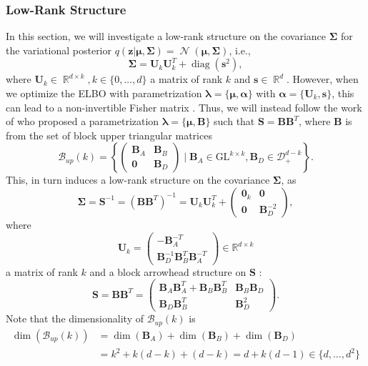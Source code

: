 \documentclass[a4paper, 11pt, oneside]{scrartcl}
\theoremstyle{break}
\DeclareMathOperator{\Normal}{\mathcal{N}}
\DeclareMathOperator{\Real}{\mathbb{R}}
\DeclareMathOperator{\diag}{diag}
\newcommand{\matr}[1]{\boldsymbol{#1}}
\newcommand{\set}[1]{\mathcal{#1}}
\numberwithin{equation}{section}
\begin{document}
			\subsubsection{Low-Rank Structure}
				In this section, we will investigate a low-rank structure on the covariance $\matr{\Sigma}$ for the variational posterior $q(\matr{z} | \matr{\mu}, \matr{\Sigma}) = \Normal(\matr{\mu}, \matr{\Sigma})$, i.e., 
					$$\matr{\Sigma} = \matr{U}_k \matr{U}_k^T + \diag(\matr{s}^2),$$ 
				where $\matr{U}_k \in \Real^{d \times k}, k \in \{0, \dots, d\}$ a matrix of rank $k$ and $\matr{s} \in \Real^d.$
				However, when we optimize the ELBO with parametrization $\matr{\lambda} = \{\matr{\mu}, \matr{\alpha}\}$ with $\matr{\alpha} = \{\matr{U}_k, \matr{s}\}$, this can lead to a non-invertible Fisher matrix \cite[Sec. J.1.6]{LNK+21}. 
				Thus, we will instead follow the work of \cite{LNK+21} who proposed a parametrization $\matr{\lambda} = \{\matr{\mu}, \matr{B}\}$ such that $\matr{S} = \matr{B} \matr{B}^T$, where $\matr{B}$ is from the set of block upper triangular matrices
					$$\set{B}_{up}(k) = \left\{\begin{pmatrix} \matr{B}_A & \matr{B}_B \\
														        \matr{0}  & \matr{B}_D
										  \end{pmatrix} \mid \matr{B}_A \in \text{GL}^{k \times k}, \matr{B}_D \in \set{D}_+^{d-k}\right\}.$$
				This, in turn induces a low-rank structure on the covariance $\matr{\Sigma}$, as 
				$$\matr{\Sigma} = \matr{S}^{-1} = (\matr{B} \matr{B}^T)^{-1} = \matr{U}_k \matr{U}_k^T + \begin{pmatrix} \matr{0}_k & \matr{0} \\ \matr{0} & \matr{B}_D^{-2}\end{pmatrix},$$
				where 
				$$\matr{U}_k = \begin{pmatrix} -\matr{B}_A^{-T} \\ \matr{B}_D^{-1} \matr{B}_B^T \matr{B}_A^{-T}\end{pmatrix} \in \mathbb{R}^{d \times k}$$
				a matrix of rank $k$ and a block arrowhead structure on $\matr{S}$ \cite{OS90}:
				$$\matr{S} = \matr{B} \matr{B}^T = \begin{pmatrix} \matr{B}_A \matr{B}_A^T + \matr{B}_B \matr{B}_B^T & \matr{B}_B \matr{B}_D \\ \matr{B}_D \matr{B}_B^T & \matr{B}_D^2 \end{pmatrix}.$$
				Note that the dimensionality of $\set{B}_{up}(k)$ is
				\begin{align*}
					\dim(\set{B}_{up}(k)) &= \dim (\matr{B}_A) + \dim (\matr{B}_B) + \dim (\matr{B}_D) \\
					&= k^2 + k (d - k) + (d - k) = d + k (d - 1) \in \{d, \dots, d^2\}
				\end{align*}
\end{document}
